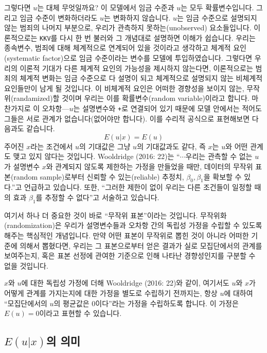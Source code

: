 \documentclass[
]{book}
\begin{document}
그렇다면 \(u\)는 대체 무엇일까요? 이 모델에서 임금 수준과 \(u\)는 모두 확률변수입니다. 그리고 임금 수준이 변화하더라도 \(u\)는 변화하지 않습니다. \(u\)는 임금 수준으로 설명되지 않는 범죄의 나머지 부분으로, 우리가 관측하지 못하는(unobserved) 요소들입니다. 이론적으로는 \texttt{KKV}를 다시 한 번 불러와 그 개념대로 설명하면 이해가 쉽습니다. 우리는 종속변수, 범죄에 대해 체계적으로 연계되어 있을 것이라고 생각하고 체계적 요인(systematic factor)으로 임금 수준이라는 변수를 모델에 투입하였습니다. 그렇다면 우리의 이론적 기대가 다른 체계적 요인의 가능성을 제시하지 않는다면, 이론적으로는 범죄의 체계적 변화는 임금 수준으로 다 설명이 되고 체계적으로 설명되지 않는 비체계적 요인들만이 남게 될 것입니다. 이 비체계적 요인은 어떠한 경향성을 보이지 않는, 무작위(randamized)할 것이며 우리는 이를 확률변수(random variable)이라고 합니다. 마찬가지로 이 오차항---\(u\)는 설명변수와 \texttt{+}로 연결되어 있기 때문에 모델 안에서는 적어도 그들은 서로 관계가 없습니다(없어야만 합니다). 이를 수리적 공식으로 표현해보면 다음과도 같습니다.
\[E(u|x) = E(u)\]
주어진 \(x\)라는 조건에서 \(u\)의 기대값은 그냥 \(u\)의 기대값과도 같다, 즉 \(x\)는 \(u\)와 어떤 관계도 맺고 있지 않다는 것입니다. Wooldridge (2016: 22)는 ``\(\cdots\)우리는 관측할 수 없는 \(u\)가 설명변수 \(x\)와 관계되지 않도록 제한하는 가정을 만들었을 때만, 데이터의 무작위 표본(random sample)로부터 신뢰할 수 있는(reliable) 추정치, \(\beta_0, \beta_1\)을 확보할 수 있다.''고 언급하고 있습니다. 또한, ``그러한 제한이 없이 우리는 다른 조건들이 일정할 때의 효과 \(\beta_1\)를 추정할 수 없다''고 서술하고 있습니다.

여기서 하나 더 중요한 것이 바로 ``무작위 표본''이라는 것입니다. 무작위화(randomization)은 우리가 설명변수들과 오차항 간의 독립성 가정을 수립할 수 있도록 해주는 핵심적인 개념입니다. 만약 어떤 표본이 무작위로 뽑힌 것이 아니라 어떠한 기준에 의해서 뽑혔다면, 우리는 그 표본으로부터 얻은 결과가 실로 모집단에서의 관계를 보여주는지, 혹은 표본 선정에 관여한 기준으로 인해 나타난 경향성인지를 구분할 수 없을 것입니다.

\(x\)와 \(u\)에 대한 독립성 가정에 더해 Wooldridge (2016: 22)와 같이, 여기서도 \(u\)와 \(x\)가 어떻게 관계를 가지는지에 대한 가정을 별도로 수립하기 전까지는, 항상 \(u\)에 대하여 ``모집단에서의 \(u\)의 평균값은 0이다''라는 가정을 수립하도록 합니다. 이 가정은 \(E(u) = 0\)이라고 표현할 수 있습니다.

\hypertarget{euxuxc758-uxc758uxbbf8}{%
\subsection{\texorpdfstring{\(E(u|x)\)의 의미}{E(u\textbar x)의 의미}}\label{euxuxc758-uxc758uxbbf8}}
\end{document}
